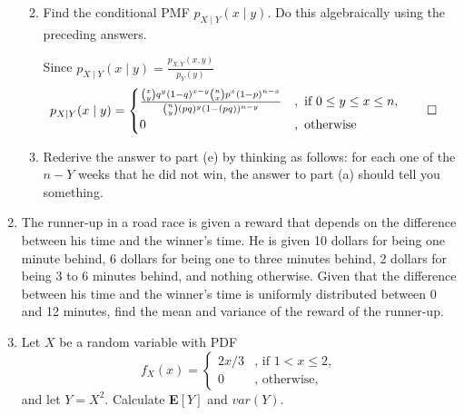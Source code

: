 \documentclass[paper=usletter, fontsize=12pt]{article}
\begin{document}
\begin{enumerate}
\begin{enumerate}
\begin{cproof}
            \end{cproof}

            \item Find the conditional PMF $p_{X \mid Y}(x \mid y)$. Do this
            algebraically using the preceding answers.
            \begin{cproof}

                Since $p_{X \mid Y}(x \mid y) = \frac{p_{X, Y}(x, y)}{p_Y(y)}$
                \begin{align*}
                    p_{X \mid Y}(x \mid y) & =
                    \begin{cases}
                        \frac{\binom{x}{y}q^y(1-q)^{x-y}\binom{n}{x}p^x(1-p)^{n-x}}{\binom{n}{y}(pq)^y(1-(pq))^{n-y}} &, \text{ if } 0 \le y \le x \le n,\\
                        0 &, \text{ otherwise }
                    \end{cases} \qedhere
                \end{align*}
                \endgroup

            \end{cproof}

            \item Rederive the answer to part (e) by thinking as follows: for
            each one of the $n - Y$ weeks that he did not win, the answer to
            part (a) should tell you something.
            \begin{cproof}
            \end{cproof}

        \end{enumerate}

        \item The runner-up in a road race is given a reward that depends on
        the difference between his time and the winner's time. He is given 10
        dollars for being one minute behind, 6 dollars for being one to three
        minutes behind, 2 dollars for being 3 to 6 minutes behind, and nothing
        otherwise. Given that the difference between his time and the winner's
        time is uniformly distributed between 0 and 12 minutes, find the mean
        and variance of the reward of the runner-up.
        \begin{cproof}
        \end{cproof}

        \item Let $X$ be a random variable with PDF
        \begin{equation*}
            f_X(x) = \begin{cases}
                2x/3 & \text{, if } 1 < x \le 2,\\
                0 & \text{, otherwise, }
            \end{cases}
        \end{equation*}
        and let $Y=X^2$. Calculate \textbf{E}$[Y]$ and $var(Y)$.
        \begin{cproof}


\end{cproof}
\end{enumerate}
\end{document}
